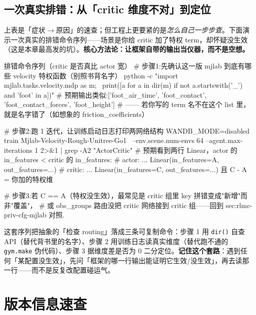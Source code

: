 \subsection*{一次真实排错：从「critic 维度不对」到定位}
\label{sec:rlmc-priv-realdebug}

上表是「症状$\to$原因」的速查；但工程上更要紧的是\emph{怎么自己一步步查}。下面演示一次真实的排错命令序列——场景是你给 critic 加了特权 term，却怀疑没生效（这是本章最高发的坑）。\textbf{核心方法论：让框架自带的输出当仪器，而不是空想。}

\begin{codebox}[bash]{排错命令序列（critic 是否真比 actor 宽）}
# 步骤1:先确认这一版 mjlab 到底有哪些 velocity 特权函数（别照书背名字）
python -c "import mjlab.tasks.velocity.mdp as m; \
print([a for a in dir(m) if not a.startswith('_') and 'foot' in a])"
# 预期输出类似:['foot_air_time', 'foot_contact', 'foot_contact_forces', 'foot_height']
# —— 若你写的 term 名不在这个 list 里，就是名字错了（如想象的 friction_coefficients）

# 步骤2:跑 1 迭代，让训练启动日志打印两网络结构
WANDB_MODE=disabled train Mjlab-Velocity-Rough-Unitree-Go1 \
    --env.scene.num-envs 64 --agent.max-iterations 1 2>&1 | grep -A2 "ActorCritic"
# 预期看到两行 Linear，actor 的 in_features < critic 的 in_features:
#   actor:  ... Linear(in_features=A, out_features=...)
#   critic: ... Linear(in_features=C, out_features=...)   且 C - A = 你加的特权维

# 步骤3:若 C == A（特权没生效），最常见是 critic 组里 key 拼错变成"新增"而非"覆盖"，
# 或 obs_groups 路由没把 critic 网络接到 critic 组——回到 sec:rlmc-priv-cfg-mjlab 对照.
\end{codebox}

这套序列把抽象的「检查 routing」落成三条可复制命令：步骤 1 用 \verb|dir()| 自查 API（替代背书里的名字）、步骤 2 用训练日志读真实维度（替代跑不通的 \verb|gym.make| 伪代码）、步骤 3 据维度差是否为 0 二分定位。\textbf{记住这个套路}：遇到任何「某配置没生效」，先问「框架的哪一行输出能证明它生效/没生效」，再去读那一行——而不是反复改配置碰运气。

\section*{版本信息速查}
\addcontentsline{toc}{section}{版本信息速查}
\label{sec:rlmc-priv-version}

